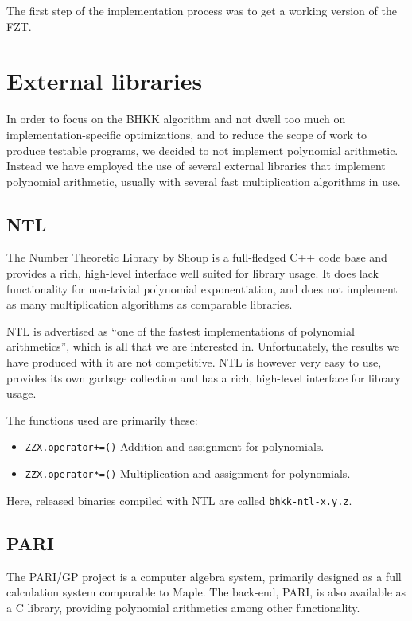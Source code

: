 \documentclass{cslthse-msc}
\newcommand{\code}{\texttt}
\begin{document}
The first step of the implementation process was to get a working version of the FZT. 

\section{External libraries}
In order to focus on the BHKK algorithm and not dwell too much on implementation-specific optimizations, and to reduce the scope of work to produce testable programs, we decided to not implement polynomial arithmetic. Instead we have employed the use of several external libraries that implement polynomial arithmetic, usually with several fast multiplication algorithms in use.

\subsection{NTL}
The Number Theoretic Library by Shoup \cite{ntl} is a full-fledged C++ code base and provides a rich, high-level interface well suited for library usage. It does lack functionality for non-trivial polynomial exponentiation, and does not implement as many multiplication algorithms as comparable libraries.

NTL is advertised as ``one of the fastest implementations of polynomial arithmetics'', which is all that we are interested in. Unfortunately, the results we have produced with it are not competitive. NTL is however very easy to use, provides its own garbage collection and has a rich, high-level interface for library usage.

The functions used are primarily these: 

\begin{itemize}
\item \code{ZZX.operator+=()}
\subitem Addition and assignment for polynomials. %
\item \code{ZZX.operator*=()}
\subitem Multiplication and assignment for polynomials. %
\end{itemize}

Here, released binaries compiled with NTL are called \code{bhkk-ntl-x.y.z}.

\subsection{PARI}
The PARI/GP project \cite{pari} is a computer algebra system, primarily designed as a full calculation system comparable to Maple. The back-end, PARI, is also available as a C library, providing polynomial arithmetics among other functionality.
\end{document}
